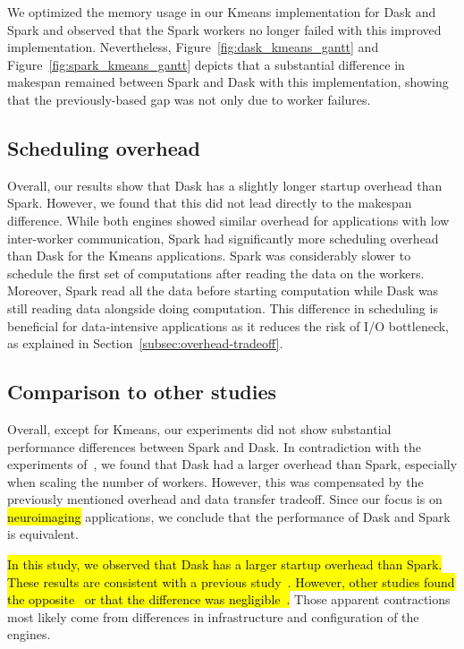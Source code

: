 \documentclass[AMA,STIX1COL]{WileyNJD-v2}
\newcommand{\HL}[1]{\hl{#1}}
\begin{document}
We optimized the memory usage in our Kmeans implementation for Dask and Spark
and observed that the Spark workers no longer failed with this improved implementation.
Nevertheless, Figure~{\ref{fig:dask_kmeans_gantt}} and Figure~{\ref{fig:spark_kmeans_gantt}} depicts that a substantial difference in makespan remained between Spark and Dask with this implementation,
showing that the previously-based gap was not only due to worker failures.
							
\subsection{Scheduling overhead}
Overall, our results show that Dask has a slightly longer startup overhead than Spark.
However, we found that this did not lead directly to the makespan difference.
While both engines showed similar overhead for applications with low inter-worker communication,
Spark had significantly more scheduling overhead than Dask for the Kmeans applications.
Spark was considerably slower to schedule the first set of computations after reading the data on the workers.
Moreover, Spark read all the data before starting computation while Dask was still reading data alongside doing computation.
This difference in scheduling is beneficial for data-intensive applications as it reduces the risk
of I/O bottleneck, as explained in Section~{\ref{subsec:overhead-tradeoff}}.
																	
\subsection{Comparison to other studies}
Overall, except for Kmeans, our experiments did not show substantial performance differences between Spark and Dask.
In contradiction with the experiments of~\cite{Mehta:17}, we found that Dask had a larger overhead than Spark, especially when scaling the number of workers.
However, this was compensated by the previously mentioned overhead and data transfer tradeoff.
Since our focus is on \HL{neuroimaging} applications, we conclude that the performance of Dask and Spark is equivalent.
				
\HL{
	In this study, we observed that Dask has a larger startup overhead than Spark.
	These results are consistent with a previous study~{\cite{Mehta:17}}.
	However, other studies found the opposite~{\cite{8588652}} or that the difference was negligible~{\cite{8943502}}.
}
Those apparent contractions most likely come from differences in infrastructure and configuration of the engines.
																	
\end{document}
